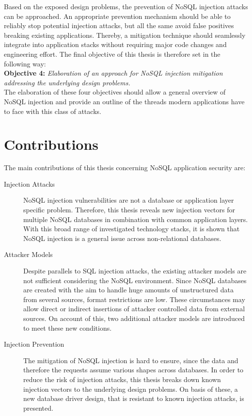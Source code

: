 Based on the exposed design problems, the prevention of NoSQL injection attacks can be approached. An appropriate prevention mechanism should be able to reliably stop potential injection attacks, but all the same avoid false positives breaking existing applications. Thereby, a mitigation technique should seamlessly integrate into application stacks without requiring major code changes and engineering effort. The final objective of this thesis is therefore set in the following way:\\

\textbf{Objective 4:} \textit{Elaboration of an approach for NoSQL injection mitigation addressing the underlying design problems.} \\

The elaboration of these four objectives should allow a general overview of NoSQL injection and provide an outline of the threads modern applications have to face with this class of attacks. \\


\section{Contributions}

The main contributions of this thesis concerning NoSQL application security are:
\begin{description}
\item [Injection Attacks] NoSQL injection vulnerabilities are not a database or application layer specific problem. Therefore, this thesis reveals new injection vectors for multiple NoSQL databases in combination with common application layers. With this broad range of investigated technology stacks, it is shown that NoSQL injection is a general issue across non-relational databases.
\item [Attacker Models] Despite parallels to SQL injection attacks, the existing attacker models are not sufficient considering the NoSQL environment. Since NoSQL databases are created with the aim to handle huge amounts of unstructured data from several sources, format restrictions are low. These circumstances may allow direct or indirect insertions of attacker controlled data from external sources. On account of this, two additional attacker models are introduced to meet these new conditions.
\item [Injection Prevention] The mitigation of NoSQL injection is hard to ensure, since the data and therefore the requests assume various shapes across databases. In order to reduce the risk of injection attacks, this thesis breaks down known injection vectors to the underlying design problems. On basis of these, a new database driver design, that is resistant to known injection attacks, is presented.
\end{description}

